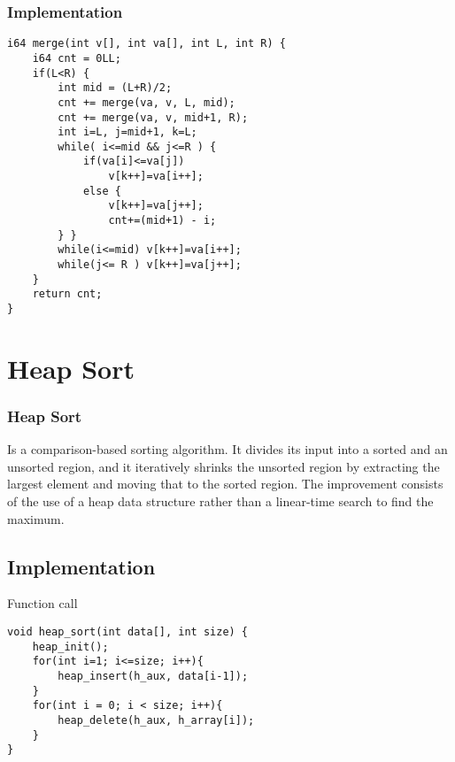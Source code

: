 \documentclass{beamer}
\begin{document}
\begin{frame}[fragile]
\frametitle{ Implementation }

\begin{lstlisting}
i64 merge(int v[], int va[], int L, int R) {
    i64 cnt = 0LL;
    if(L<R) {
        int mid = (L+R)/2;
        cnt += merge(va, v, L, mid);
        cnt += merge(va, v, mid+1, R);
        int i=L, j=mid+1, k=L;
        while( i<=mid && j<=R ) {
            if(va[i]<=va[j])
                v[k++]=va[i++];
            else {
                v[k++]=va[j++];
                cnt+=(mid+1) - i;
        } }
        while(i<=mid) v[k++]=va[i++];
        while(j<= R ) v[k++]=va[j++];
    }
    return cnt;
}
\end{lstlisting}

\end{frame}



\section{Heap Sort} 

\begin{frame}[fragile]

\frametitle{Heap Sort}

Is a comparison-based sorting algorithm. It divides its input into a sorted and an unsorted region, and it iteratively shrinks the unsorted region by extracting the largest element and moving that to the sorted region. The improvement consists of the use of a heap data structure rather than a linear-time search to find the maximum.

\subsection{Implementation}
\begin{block}{Function call}
\begin{lstlisting}
void heap_sort(int data[], int size) {
    heap_init();
    for(int i=1; i<=size; i++){
        heap_insert(h_aux, data[i-1]);
    }
    for(int i = 0; i < size; i++){
        heap_delete(h_aux, h_array[i]);
    }
}
\end{lstlisting}
\end{block}

\end{frame}
\end{document}
